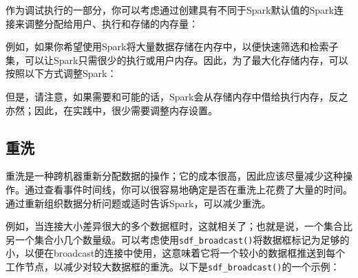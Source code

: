 \documentclass[
]{article}
\newenvironment{Shaded}{\begin{snugshade}}{\end{snugshade}}
\newcommand{\CommentTok}[1]{\textcolor[rgb]{0.56,0.35,0.01}{\textit{#1}}}
\newcommand{\FloatTok}[1]{\textcolor[rgb]{0.00,0.00,0.81}{#1}}
\newcommand{\KeywordTok}[1]{\textcolor[rgb]{0.13,0.29,0.53}{\textbf{#1}}}
\newcommand{\NormalTok}[1]{#1}
\newcommand{\OperatorTok}[1]{\textcolor[rgb]{0.81,0.36,0.00}{\textbf{#1}}}
\newcommand{\StringTok}[1]{\textcolor[rgb]{0.31,0.60,0.02}{#1}}
\begin{document}
作为调试执行的一部分，你可以考虑通过创建具有不同于Spark默认值的Spark连接来调整分配给用户、执行和存储的内存量：

\begin{Shaded}
\end{Shaded}

例如，如果你希望使用Spark将大量数据存储在内存中，以便快速筛选和检索子集，可以让Spark只需很少的执行或用户内存。因此，为了最大化存储内存，可以按照以下方式调整Spark：

\begin{Shaded}
\end{Shaded}

但是，请注意，如果需要和可能的话，Spark会从存储内存中借给执行内存，反之亦然；因此，在实践中，很少需要调整内存设置。

\hypertarget{ux91cdux6d17}{%
\subsection{重洗}\label{ux91cdux6d17}}

重洗是一种跨机器重新分配数据的操作；它的成本很高，因此应该尽量减少这种操作。通过查看事件时间线，你可以很容易地确定是否在重洗上花费了大量的时间。通过重新组织数据分析问题或适时告诉Spark，可以减少重洗。

例如，当连接大小差异很大的多个数据框时，这就相关了；也就是说，一个集合比另一个集合小几个数量级。可以考虑使用\texttt{sdf\_broadcast()}将数据框标记为足够的小，以便在broadcast的连接中使用，这意味着它将一个较小的数据框推送到每个工作节点，以减少对较大数据框的重洗。以下是\texttt{sdf\_broadcast()}的一个示例：
\end{document}
